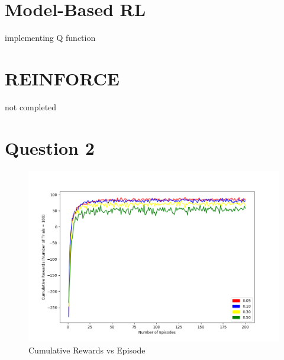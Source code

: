 \documentclass[10pt]{article}
\begin{document}
\section{Model-Based RL}
implementing Q function


\section{REINFORCE}
not completed

\section{}

\section{Question 2}
\begin{figure}[h]
  \caption{Cumulative Rewards vs Episode}
  \label{q2}
  \centering
  \includegraphics[width=\textwidth]{q2}
\end{figure}



\inputminted{python}{RL2.py}
\end{document}
